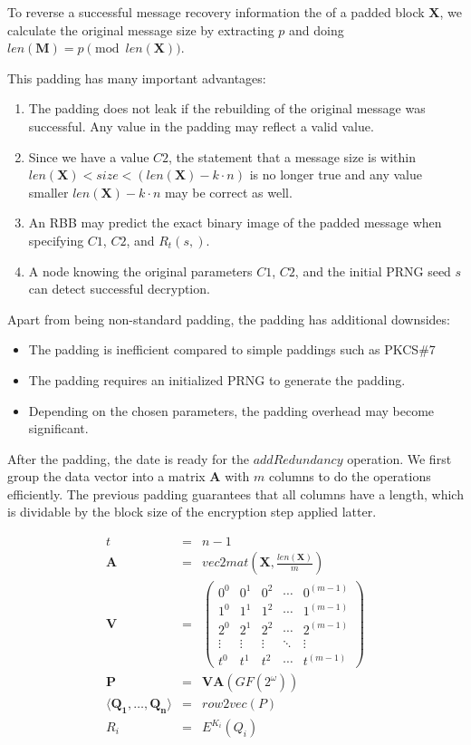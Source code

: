 To reverse a successful message recovery information the of a padded block $\mathbf{X}$, we calculate the original message size by extracting $p$ and doing $len(\mathbf{M})=p \pmod{ len(\mathbf{X})}$.

This padding has many important advantages:
\begin{enumerate}
	\item The padding does not leak if the rebuilding of the original message was successful. Any value in the padding may reflect a valid value.
	\item Since we have a value $C2$, the statement that a message size is within $len(\mathbf{X})<size<(len(\mathbf{X})-k\cdot n)$ is no longer true and any value smaller $len(\mathbf{X})-k\cdot n$ may be correct as well.
	\item An RBB may predict the exact binary image of the padded message when specifying $C1$, $C2$, and $R_{t}(s,)$.
	\item A node knowing the original parameters $C1$, $C2$, and the initial PRNG seed $s$ can detect successful decryption.
\end{enumerate}

Apart from being non-standard padding, the padding has additional downsides:
\begin{itemize}
	\item The padding is inefficient compared to simple paddings such as PKCS\#7
	\item The padding requires an initialized PRNG to generate the padding.
	\item Depending on the chosen parameters, the padding overhead may become significant. 
\end{itemize}

After the padding, the date is ready for the $addRedundancy$ operation. We first group the data vector into a matrix $\mathbf{A}$ with $m$ columns to do the operations efficiently. The previous padding guarantees that all columns have a length, which is dividable by the block size of the encryption step applied latter.

\begin{eqnarray}
t          & = & n-1\\
\mathbf{A} & = & vec2mat\left(\mathbf{X},\frac{len\left(\mathbf{X}\right)}{m}\right)\\
\mathbf{V} & = & \left(\begin{matrix}
0^0 & 0^1 & 0^2 & \cdots & 0^{(m-1)} \\
1^0 & 1^1 & 1^2 & \cdots & 1^{(m-1)} \\
2^0 & 2^1 & 2^2 & \cdots & 2^{(m-1)} \\
\vdots & \vdots & \vdots & \ddots & \vdots \\
t^0 & t^1 & t^2 & \cdots & t^{(m-1)}
\end{matrix}\right)\\
\mathbf{P} & = & \mathbf{V}\mathbf{A} \left(GF\left(2^\omega\right)\right)\\
\langle \mathbf{Q_1}, \ldots , \mathbf{Q_n} \rangle & = & row2vec(P)\\
R_i & = & E^{K_i}\left(Q_i\right)
\end{eqnarray}    

